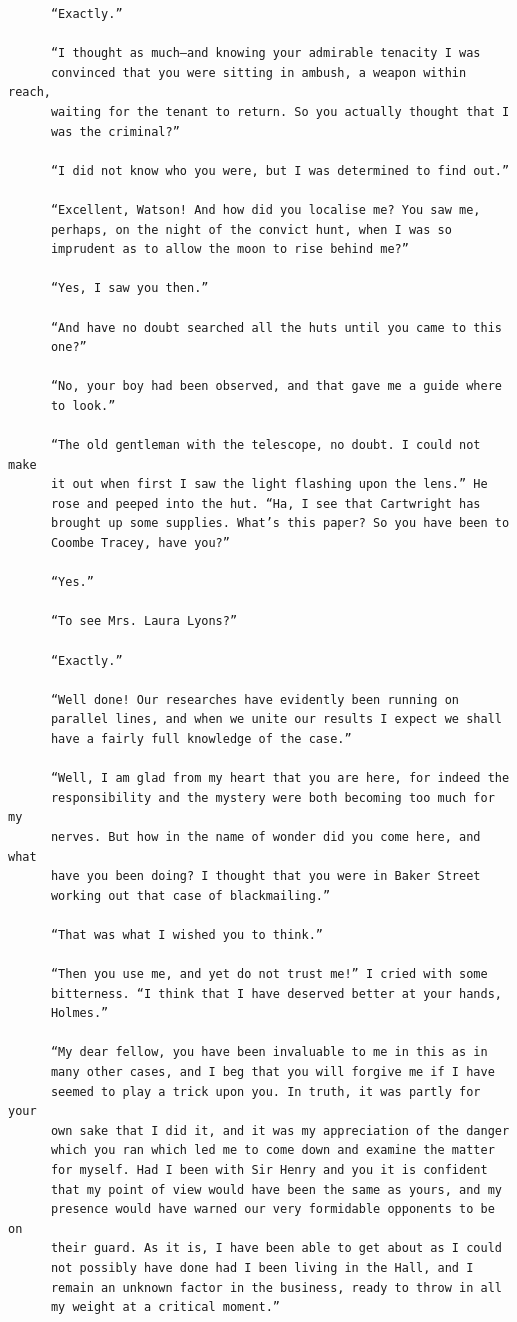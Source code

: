 \documentclass{article}
\begin{document}
\begin{verbatim}
      “Exactly.”

      “I thought as much—and knowing your admirable tenacity I was
      convinced that you were sitting in ambush, a weapon within reach,
      waiting for the tenant to return. So you actually thought that I
      was the criminal?”

      “I did not know who you were, but I was determined to find out.”

      “Excellent, Watson! And how did you localise me? You saw me,
      perhaps, on the night of the convict hunt, when I was so
      imprudent as to allow the moon to rise behind me?”

      “Yes, I saw you then.”

      “And have no doubt searched all the huts until you came to this
      one?”

      “No, your boy had been observed, and that gave me a guide where
      to look.”

      “The old gentleman with the telescope, no doubt. I could not make
      it out when first I saw the light flashing upon the lens.” He
      rose and peeped into the hut. “Ha, I see that Cartwright has
      brought up some supplies. What’s this paper? So you have been to
      Coombe Tracey, have you?”

      “Yes.”

      “To see Mrs. Laura Lyons?”

      “Exactly.”

      “Well done! Our researches have evidently been running on
      parallel lines, and when we unite our results I expect we shall
      have a fairly full knowledge of the case.”

      “Well, I am glad from my heart that you are here, for indeed the
      responsibility and the mystery were both becoming too much for my
      nerves. But how in the name of wonder did you come here, and what
      have you been doing? I thought that you were in Baker Street
      working out that case of blackmailing.”

      “That was what I wished you to think.”

      “Then you use me, and yet do not trust me!” I cried with some
      bitterness. “I think that I have deserved better at your hands,
      Holmes.”

      “My dear fellow, you have been invaluable to me in this as in
      many other cases, and I beg that you will forgive me if I have
      seemed to play a trick upon you. In truth, it was partly for your
      own sake that I did it, and it was my appreciation of the danger
      which you ran which led me to come down and examine the matter
      for myself. Had I been with Sir Henry and you it is confident
      that my point of view would have been the same as yours, and my
      presence would have warned our very formidable opponents to be on
      their guard. As it is, I have been able to get about as I could
      not possibly have done had I been living in the Hall, and I
      remain an unknown factor in the business, ready to throw in all
      my weight at a critical moment.”


\end{verbatim}
\end{document}
